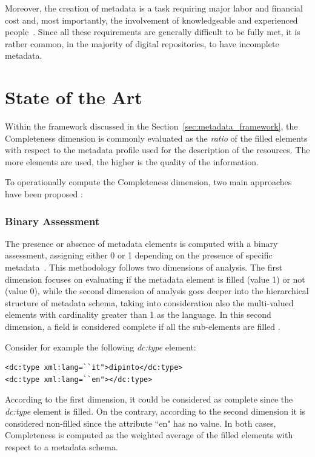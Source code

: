 \documentclass[epsfig,a4paper,12pt,titlepage]{book}
\begin{document}
Moreover, the creation of metadata is a task requiring major labor and financial cost and, most importantly, the involvement of knowledgeable and experienced people~\cite{liddy2002automatic, barton2003building}.
Since all these requirements are generally difficult to be fully met, it is rather common, in the majority of digital repositories, to have incomplete metadata.

\section{State of the Art}
\label{sec:compstate}
Within the framework discussed in the Section~\ref{sec:metadata_framework}, the Completeness dimension is commonly evaluated as the \textit{ratio} of the filled elements with respect to the metadata profile used for the description of the resources. The more elements are used, the higher is the quality of the information.

To operationally compute the Completeness dimension, two main approaches have been proposed \cite{margaritopoulos2012quantifying, kiraly2018measuring, 2}:  

\subsubsection{Binary Assessment}
The presence or absence of metadata elements is computed with a binary assessment, assigning either 0 or 1 depending on the presence of specific metadata~\cite{2}. This methodology follows two dimensions of analysis. The first dimension focuses on evaluating if the metadata element is filled (value 1) or not (value 0)\cite{2}, while the second dimension of analysis goes deeper into the hierarchical structure of metadata schema, taking into consideration also the multi-valued elements with cardinality greater than 1 as the language. In this second dimension, a field is considered complete if all the sub-elements are filled \cite{margaritopoulos2012quantifying}.

Consider for example the following \textit{dc:type} element: 

\lstset{language=XML}
\begin{lstlisting}
<dc:type xml:lang=``it">dipinto</dc:type>
<dc:type xml:lang=``en"></dc:type>
\end{lstlisting}

According to the first dimension, it could be considered as complete since the \textit{ dc:type} element is filled. On the contrary, according to the second dimension it is considered non-filled since the attribute ``en" has no value. In both cases, Completeness is computed as the weighted average of the filled elements with respect to a metadata schema.
\end{document}
